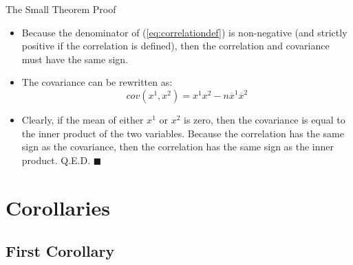 \documentclass[aspectratio=169]{beamer}
\begin{document}

\begin{frame}{The Small Theorem Proof}

\begin{itemize}
    \item<1-> Because the denominator of (\ref{eq:correlationdef}) is non-negative (and strictly positive if the correlation is defined), then the correlation and covariance must have the same sign.
    \item<2-> The covariance can be rewritten as:
    \begin{equation*}
        cov\left( x^{1}, x^{2} \right) = x^{1} x^{2} - n \overline{x}^{1} \overline{x}^{2}
    \end{equation*}
    \item<3-> Clearly, if the mean of either $ x^1 $ or $ x^2 $ is zero, then the covariance is equal to the inner product of the two variables.  Because the correlation has the same sign as the covariance, then the correlation has the same sign as the inner product.  Q.E.D. $\blacksquare$
\end{itemize}
    
\end{frame}


\section{Corollaries}


\subsection{First Corollary}

\end{document}
